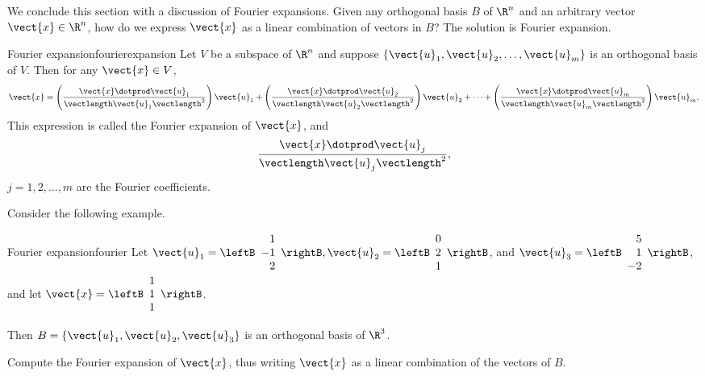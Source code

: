 We conclude this section with a discussion of Fourier expansions. Given any orthogonal basis $B$ of $\R^n$ and an arbitrary vector $\vect{x} \in \R^n$, how do we express $\vect{x}$ as a linear combination of vectors in $B$? The solution is Fourier expansion. 

\begin{theorem}{Fourier expansion}{fourierexpansion}
Let $V$ be a subspace of $\R^n$ and suppose $\{ \vect{u}_1, \vect{u}_2, \ldots, \vect{u}_m \}$
is an orthogonal basis of $V$. 
Then for any $\vect{x}\in V$,
\[ \vect{x} = 
\left(\frac{\vect{x}\dotprod \vect{u}_1}{\vectlength \vect{u}_1 \vectlength^2}\right) \vect{u}_1 +
\left(\frac{\vect{x}\dotprod \vect{u}_2}{\vectlength \vect{u}_2 \vectlength^2}\right) \vect{u}_2 +
\cdots +
\left(\frac{\vect{x}\dotprod \vect{u}_m}{\vectlength \vect{u}_m \vectlength^2}\right) \vect{u}_m.
\]
This expression is called the Fourier expansion 
of $\vect{x}$, and 
\[ \frac{\vect{x}\dotprod \vect{u}_j}{\vectlength \vect{u}_j \vectlength^2},\]
$j=1,2,\ldots,m$
are the Fourier coefficients.
\end{theorem}

Consider the following example.

\begin{example}{Fourier expansion}{fourier}
Let
$\vect{u}_1= \leftB\begin{array}{r} 1 \\ -1 \\ 2 \end{array}\rightB,
\vect{u}_2= \leftB\begin{array}{r} 0 \\ 2 \\ 1  \end{array}\rightB$,
and
$\vect{u}_3 =\leftB\begin{array}{r} 5 \\ 1 \\ -2 \end{array}\rightB$, 
and let 
$\vect{x} =\leftB\begin{array}{r} 1 \\ 1 \\ 1 \end{array}\rightB$.

Then $B=\{ \vect{u}_1, \vect{u}_2, \vect{u}_3\}$
is an orthogonal basis of $\R^3$. 

Compute the Fourier expansion of $\vect{x}$, thus writing $\vect{x}$ as  a linear combination of the vectors of $B$. 
\end{example}

